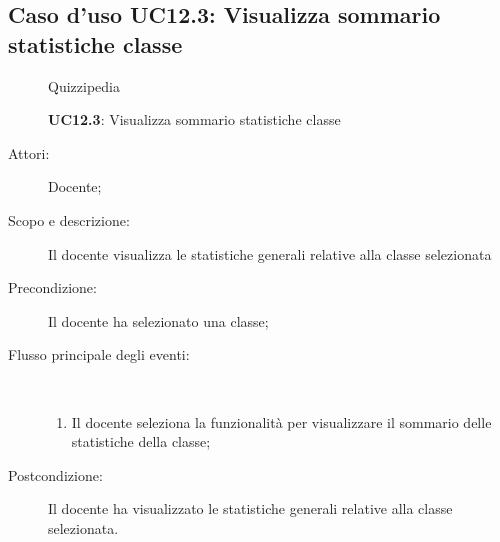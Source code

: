 \subsection{Caso d'uso UC12.3: Visualizza sommario statistiche classe}
	\begin{figure}[H]
		\centering
		\begin{resizedtikzpicture}{\textwidth}
		\begin{umlsystem}[x=0, fill=lightgray!20]{Quizzipedia}
		\end{umlsystem}
		\end{resizedtikzpicture}
		\caption{\textbf{UC12.3}: Visualizza sommario statistiche classe}
		\label{UC12.3}
	\end{figure}
\begin{description}
\item[Attori:] Docente;
\item[Scopo e descrizione:] Il docente visualizza le statistiche generali relative alla classe selezionata
      \item[Precondizione:] Il docente ha selezionato una classe;

        \item[Flusso principale degli eventi:] \ 
 \begin{enumerate}
          \item Il docente seleziona la funzionalità per visualizzare il sommario delle statistiche della classe;

      \end{enumerate}
    \item[Postcondizione:] Il docente ha visualizzato le statistiche generali relative alla classe selezionata.
  \end{description}
\hypertarget{UC12.4}{}
